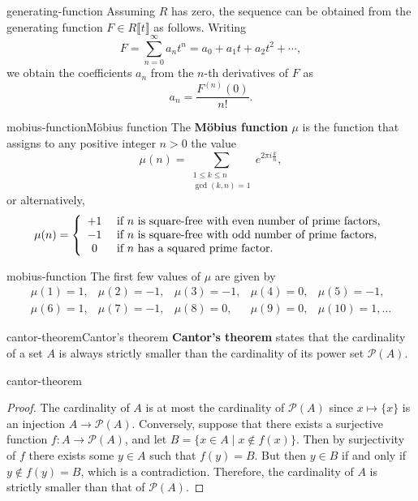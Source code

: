 \begin{example}{generating-function}
    Assuming $R$ has  zero, the sequence can be obtained from the generating function $F \in R \llbracket t \rrbracket$ as follows. Writing
    \[ F = \sum_{n = 0}^{\infty} a_n t^n = a_0 + a_1 t + a_2 t^2 + \cdots , \]
    we obtain the coefficients $a_n$ from the $n$-th derivatives of $F$ as
    \[ a_n = \frac{F^{(n)}(0)}{n!} . \]
\end{example}

\begin{topic}{mobius-function}{Möbius function}
    The \textbf{Möbius function} $\mu$ is the function that assigns to any positive integer $n > 0$ the value
    \[ \mu(n) = \sum_{\substack{1 \le k \le n \\ \gcd(k, n) = 1}} e^{2\pi i \frac{k}{n}} , \]
    or alternatively,
    \[ \mu(n) = \left\{ \begin{array}{cl}
         +1 & \textup{ if $n$ is square-free with even number of prime factors}, \\
         -1 & \textup{ if $n$ is square-free with odd number of prime factors}, \\
         0 & \textup{ if $n$ has a squared prime factor}.
    \end{array} \right. \]
\end{topic}

\begin{example}{mobius-function}
    The first few values of $\mu$ are given by
    \[ \begin{array}{lllll}
        \mu(1) = 1, & \mu(2) = -1, & \mu(3) = -1, & \mu(4) = 0, & \mu(5) = -1, \\
        \mu(6) = 1, & \mu(7) = -1, & \mu(8) = 0, & \mu(9) = 0, & \mu(10) = 1, \ldots
    \end{array} \]
\end{example}

\begin{topic}{cantor-theorem}{Cantor's theorem}
    \textbf{Cantor's theorem} states that the cardinality of a set $A$ is always strictly smaller than the cardinality of its power set $\mathcal{P}(A)$.
\end{topic}

\begin{example}{cantor-theorem}
    \begin{proof}
        The cardinality of $A$ is at most the cardinality of $\mathcal{P}(A)$ since $x \mapsto \{ x \}$ is an injection $A \to \mathcal{P}(A)$.
        Conversely, suppose that there exists a surjective function $f : A \to \mathcal{P}(A)$, and let $B = \{ x \in A \;|\; x \not\in f(x) \}$. Then by surjectivity of $f$ there exists some $y \in A$ such that $f(y) = B$. But then $y \in B$ if and only if $y \not\in f(y) = B$, which is a contradiction. Therefore, the cardinality of $A$ is strictly smaller than that of $\mathcal{P}(A)$.
    \end{proof}
\end{example}

